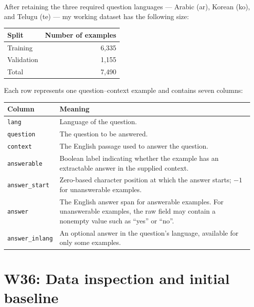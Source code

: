 \documentclass[11pt,a4paper]{article}
\begin{document}
After retaining the three required question languages
--- Arabic (ar), Korean (ko), and Telugu (te) ---
my working dataset has the following size:

\begin{center}
\begin{tabular}{lr}
\toprule
Split & Number of examples \\
\midrule
Training & 6,335 \\
Validation & 1,155 \\
\midrule
Total & 7,490 \\
\bottomrule
\end{tabular}
\end{center}

Each row represents one question--context example and contains
seven columns:

\begin{center}
\begin{tabularx}{\linewidth}{lX}
\toprule
Column & Meaning \\
\midrule
\texttt{lang}
& Language of the question. \\

\texttt{question}
& The question to be answered. \\

\texttt{context}
& The English passage used to answer the question. \\

\texttt{answerable}
& Boolean label indicating whether the example has an
extractable answer in the supplied context. \\

\texttt{answer\_start}
& Zero-based character position at which the answer starts;
$-1$ for unanswerable examples. \\

\texttt{answer}
& The English answer span for answerable examples.
For unanswerable examples, the raw field may contain
a nonempty value such as ``yes'' or ``no''. \\

\texttt{answer\_inlang}
& An optional answer in the question's language,
available for only some examples. \\
\bottomrule
\end{tabularx}
\end{center}

\section{W36: Data inspection and initial baseline}
\end{document}

